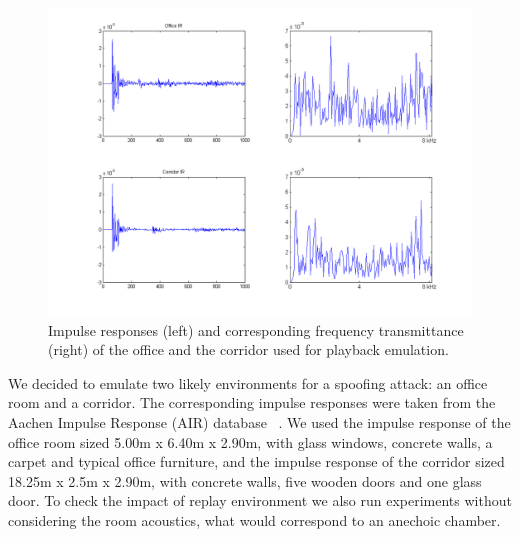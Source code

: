 \begin{figure}
	\centering
	\includegraphics[width=1\linewidth]{Figs/Room_IRs.png}
	\caption{Impulse responses (left) and corresponding frequency transmittance (right) of the office and the corridor used for playback emulation.}
	\label{fig::Room_IRs}
\end{figure}

We decided to emulate two likely environments for a spoofing attack: an office room and a corridor. The corresponding impulse responses were taken from the Aachen Impulse Response (AIR) database ~\cite{Jeub2009}. We used the impulse response of the office room sized 5.00m x 6.40m x 2.90m, with glass windows, concrete walls, a carpet and typical office furniture, and the impulse response of the corridor sized 18.25m x 2.5m x 2.90m, with concrete walls, five wooden doors and one glass door. To check the impact of replay environment we also run experiments without considering the room acoustics, what would correspond to an anechoic chamber.

